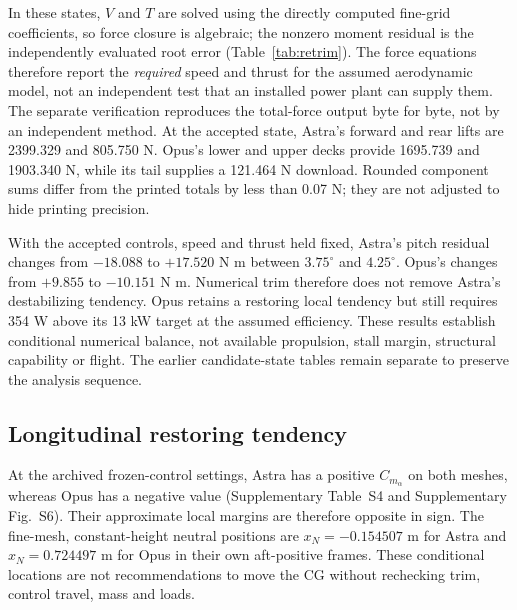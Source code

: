 \documentclass[10pt,letterpaper]{article}
\begin{document}
In these states, $V$ and $T$ are solved using the directly computed fine-grid coefficients, so force closure is algebraic; the nonzero moment residual is the independently evaluated root error (Table~\ref{tab:retrim}). The force equations therefore report the \emph{required} speed and thrust for the assumed aerodynamic model, not an independent test that an installed power plant can supply them. The separate verification reproduces the total-force output byte for byte, not by an independent method. At the accepted state, Astra's forward and rear lifts are 2399.329 and 805.750 N. Opus's lower and upper decks provide 1695.739 and 1903.340 N, while its tail supplies a 121.464 N download. Rounded component sums differ from the printed totals by less than 0.07 N; they are not adjusted to hide printing precision.

With the accepted controls, speed and thrust held fixed, Astra's pitch residual changes from $-18.088$ to $+17.520$ N m between $3.75^\circ$ and $4.25^\circ$. Opus's changes from $+9.855$ to $-10.151$ N m. Numerical trim therefore does not remove Astra's destabilizing tendency. Opus retains a restoring local tendency but still requires 354 W above its 13 kW target at the assumed efficiency. These results establish conditional numerical balance, not available propulsion, stall margin, structural capability or flight. The earlier candidate-state tables remain separate to preserve the analysis sequence.

\subsection{Longitudinal restoring tendency}
At the archived frozen-control settings, Astra has a positive $C_{m_\alpha}$ on both meshes, whereas Opus has a negative value (Supplementary Table~S4 and Supplementary Fig.~S6). Their approximate local margins are therefore opposite in sign. The fine-mesh, constant-height neutral positions are $x_N=-0.154507$ m for Astra and $x_N=0.724497$ m for Opus in their own aft-positive frames. These conditional locations are not recommendations to move the CG without rechecking trim, control travel, mass and loads.
\end{document}
